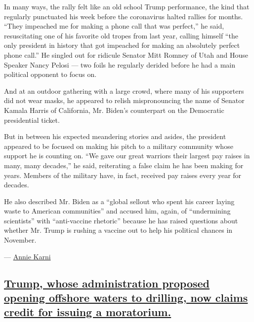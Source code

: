 In many ways, the rally felt like an old school Trump performance, the
kind that regularly punctuated his week before the coronavirus halted
rallies for months. ``They impeached me for making a phone call that was
perfect,'' he said, resuscitating one of his favorite old tropes from
last year, calling himself ``the only president in history that got
impeached for making an absolutely perfect phone call.'' He singled out
for ridicule Senator Mitt Romney of Utah and House Speaker Nancy Pelosi
--- two foils he regularly derided before he had a main political
opponent to focus on.

And at an outdoor gathering with a large crowd, where many of his
supporters did not wear masks, he appeared to relish mispronouncing the
name of Senator Kamala Harris of California, Mr. Biden's counterpart on
the Democratic presidential ticket.

But in between his expected meandering stories and asides, the president
appeared to be focused on making his pitch to a military community whose
support he is counting on. ``We gave our great warriors their largest
pay raises in many, many decades,'' he said, reiterating a false claim
he has been making for years. Members of the military have, in fact,
received pay raises every year for decades.

He also described Mr. Biden as a ``global sellout who spent his career
laying waste to American communities'' and accused him, again, of
``undermining scientists'' with ``anti-vaccine rhetoric'' because he has
raised questions about whether Mr. Trump is rushing a vaccine out to
help his political chances in November.

--- \href{https://www.nytimes3xbfgragh.onion/by/annie-karni}{Annie
Karni}

\hypertarget{trump-whose-administration-proposed-opening-offshore-waters-to-drilling-now-claims-credit-for-issuing-a-moratorium}{%
\subsection{\texorpdfstring{\protect\hyperlink{trump-whose-administration-proposed-opening-offshore-waters-to-drilling-now-claims-credit-for-issuing-a-moratorium}{Trump,
whose administration proposed opening offshore waters to drilling, now
claims credit for issuing a
moratorium.}}{Trump, whose administration proposed opening offshore waters to drilling, now claims credit for issuing a moratorium.}}\label{trump-whose-administration-proposed-opening-offshore-waters-to-drilling-now-claims-credit-for-issuing-a-moratorium}}

